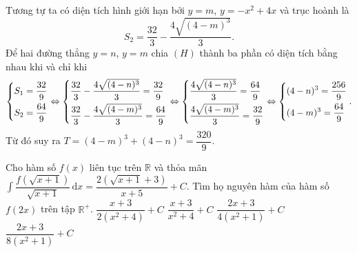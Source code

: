 \begin{ex}
{Tương tự ta có diện tích hình giới hạn bởi $y=m$, $y=-x^2+4x$ và trục hoành là 
$$S_2=\dfrac{32}{3}-\dfrac{4\sqrt{(4-m)^3}}{3}.$$
Để hai đường thẳng $y=n$, $y=m$ chia $(H)$ thành ba phần có diện tích bằng nhau khi và chỉ khi
$$\left\{\begin{aligned}&S_1=\dfrac{32}{9}\\ &S_2=\dfrac{64}{9}\end{aligned}\right.\Leftrightarrow\left\{\begin{aligned}&\dfrac{32}{3}-\dfrac{4\sqrt{(4-n)^3}}{3}=\dfrac{32}{9}\\ &\dfrac{32}{3}-\dfrac{4\sqrt{(4-m)^3}}{3}=\dfrac{64}{9}\end{aligned}\right.\Leftrightarrow\left\{\begin{aligned}&\dfrac{4\sqrt{(4-n)^3}}{3}=\dfrac{64}{9}\\ &\dfrac{4\sqrt{(4-m)^3}}{3}=\dfrac{32}{9}\end{aligned}\right.\Leftrightarrow\left\{\begin{aligned}&(4-n)^3=\dfrac{256}{9}\\ &(4-m)^3=\dfrac{64}{9}\end{aligned}\right..$$
Từ đó suy ra $T=(4-m)^3+(4-n)^3=\dfrac{320}{9}$.
}
\end{ex}

\begin{ex}%
Cho hàm số $f(x)$ liên tục trên $\mathbb{R}$ và thỏa mãn $\displaystyle\int\dfrac{f\left(\sqrt{x+1}\right)}{\sqrt{x+1}}\mathrm{\,d}x=\dfrac{2\left(\sqrt{x+1}+3\right)}{x+5}+C$. Tìm họ nguyên hàm của hàm số $f(2x)$ trên tập $\mathbb{R}^{+}$.
\choice
{$\dfrac{x+3}{2\left(x^2+4\right)}+C$}
{$\dfrac{x+3}{x^2+4}+C$}
{$\dfrac{2x+3}{4\left(x^2+1\right)}+C$}
{\True $\dfrac{2x+3}{8\left(x^2+1\right)}+C$}
\end{ex}

